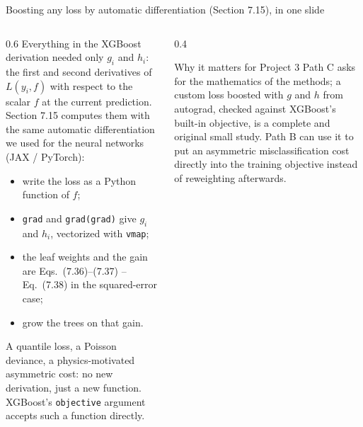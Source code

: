 \documentclass[10pt,aspectratio=169]{beamer}
\begin{document}
\begin{frame}{Boosting any loss by automatic differentiation (Section 7.15), in one slide}
\begin{columns}[T]
\begin{column}{0.6\textwidth}
\footnotesize
Everything in the XGBoost derivation needed only $g_i$ and $h_i$: the first
and second derivatives of $L(y_i,f)$ with respect to the scalar $f$ at the
current prediction.  Section 7.15 computes them with the same automatic
differentiation we used for the neural networks (JAX / PyTorch):
\begin{itemize}
  \item write the loss as a Python function of $f$;
  \item \texttt{grad} and \texttt{grad(grad)} give $g_i$ and $h_i$,
    vectorized with \texttt{vmap};
  \item the leaf weights and the gain are Eqs.\ (7.36)--(7.37) -- Eq.\
    (7.38) in the squared-error case;
  \item grow the trees on that gain.
\end{itemize}
A quantile loss, a Poisson deviance, a physics-motivated asymmetric cost: no
new derivation, just a new function.  XGBoost's \texttt{objective}
argument accepts such a function directly.
\end{column}
\begin{column}{0.4\textwidth}
\begin{block}{Why it matters for Project 3}
\footnotesize
Path C asks for the mathematics of the methods; a custom loss boosted with
$g$ and $h$ from autograd, checked against XGBoost's built-in objective, is
a complete and original small study.  Path B can use it to put an
asymmetric misclassification cost directly into the training objective
instead of reweighting afterwards.
\end{block}
\end{column}
\end{columns}
\end{frame}
\end{document}

